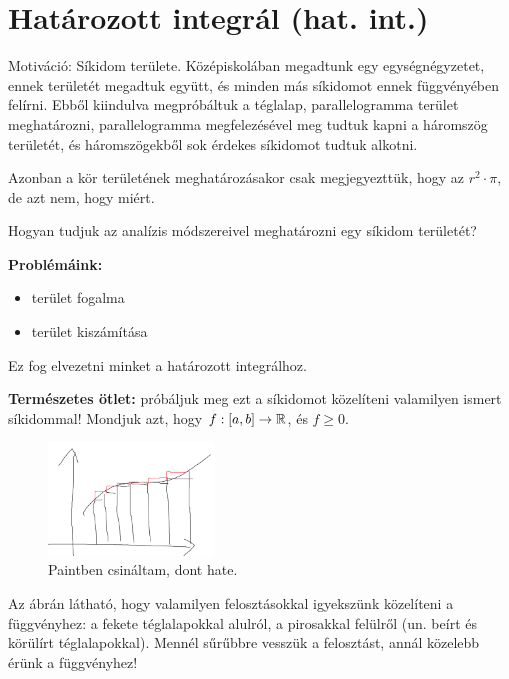 \documentclass[a4paper,11.5pt]{article}
\begin{document}
	\section{Határozott integrál (hat. int.)}
	Motiváció: Síkidom területe. Középiskolában megadtunk egy egységnégyzetet, ennek  területét megadtuk együtt, és minden más síkidomot ennek függvényében felírni. Ebből kiindulva megpróbáltuk a téglalap, parallelogramma terület meghatározni, parallelogramma megfelezésével meg tudtuk kapni a háromszög területét, és háromszögekből sok érdekes síkidomot tudtuk alkotni. 
	
	Azonban a kör területének meghatározásakor csak megjegyezttük, hogy az $r^2\cdot\pi$, de azt nem, hogy miért.
	
	\smallskip
	Hogyan tudjuk az analízis módszereivel meghatározni egy síkidom területét?
	\smallskip
	
	\textbf{Problémáink:
	}\begin{itemize}
		\item terület fogalma
		\item terület kiszámítása
	\end{itemize}
	Ez fog elvezetni minket a határozott integrálhoz.
	
	\smallskip
	\textbf{Természetes ötlet:} próbáljuk meg ezt a síkidomot közelíteni valamilyen ismert síkidommal! Mondjuk azt, hogy $f:[a,b]\to\mathbb{R}$, és $f\geq 0$. 
	
	\begin{figure}[!h]
		\centering
		\includegraphics[height=3cm]{kepek/teglalap.png}
		\caption{Paintben csináltam, dont hate.}\label{}
	\end{figure}
	
	Az ábrán látható, hogy valamilyen felosztásokkal igyekszünk közelíteni a függvényhez: a fekete téglalapokkal alulról, a pirosakkal felülről (un. beírt és körülírt téglalapokkal). Mennél sűrűbbre vesszük a felosztást, annál közelebb érünk a függvényhez!
\end{document}
